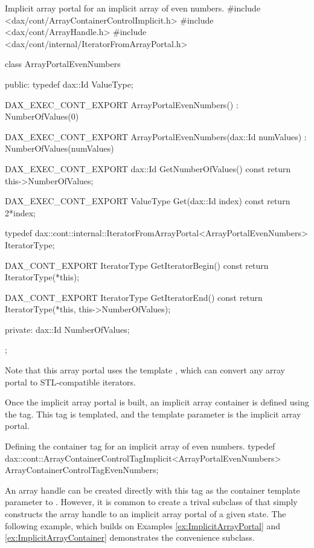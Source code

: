 \begin{daxexample}[ex:ImplicitArrayPortal]{Implicit array portal for an implicit array of even numbers.}
#include <dax/cont/ArrayContainerControlImplicit.h>
#include <dax/cont/ArrayHandle.h>
#include <dax/cont/internal/IteratorFromArrayPortal.h>

class ArrayPortalEvenNumbers
{
public:
  typedef dax::Id ValueType;

  DAX_EXEC_CONT_EXPORT
  ArrayPortalEvenNumbers() : NumberOfValues(0) {  }

  DAX_EXEC_CONT_EXPORT
  ArrayPortalEvenNumbers(dax::Id numValues) : NumberOfValues(numValues) {  }

  DAX_EXEC_CONT_EXPORT
  dax::Id GetNumberOfValues() const { return this->NumberOfValues; }

  DAX_EXEC_CONT_EXPORT
  ValueType Get(dax::Id index) const { return 2*index; }

  typedef dax::cont::internal::IteratorFromArrayPortal<ArrayPortalEvenNumbers> IteratorType;

  DAX_CONT_EXPORT
  IteratorType GetIteratorBegin() const
  {
    return IteratorType(*this);
  }

  DAX_CONT_EXPORT
  IteratorType GetIteratorEnd() const
  {
    return IteratorType(*this, this->NumberOfValues);
  }

private:
  dax::Id NumberOfValues;
};
\end{daxexample}

Note that this array portal uses the template
, which can convert any array
portal to STL-compatible iterators.

Once the implicit array portal is built, an implicit array container is
defined using the  tag. This tag
is templated, and the template parameter is the implicit array portal.

\begin{daxexample}[ex:ImplicitArrayContainer]{Defining the container tag for an implicit array of even numbers.}
typedef dax::cont::ArrayContainerControlTagImplicit<ArrayPortalEvenNumbers>
    ArrayContainerControlTagEvenNumbers;
\end{daxexample}

An array handle can be created directly with this tag as the container
template parameter to . However, it is common to
create a trival subclass of  that simply constructs
the array handle to an implicit array portal of a given state.  The
following example, which builds on Examples \ref{ex:ImplicitArrayPortal}
and \ref{ex:ImplicitArrayContainer} demonstrates the convenience
 subclass.

